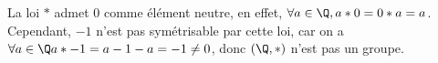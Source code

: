 La loi $\ast$ admet 0 comme élément neutre, en effet, $\forall a \in \Q, a \ast 0 = 0 \ast a = a$. Cependant, $-1$ n'est pas symétrisable par cette loi, car on a $\forall a \in \Q a \ast -1 = a -1 -a = -1 \neq 0$, donc $(\Q, \ast)$ n'est pas un groupe.